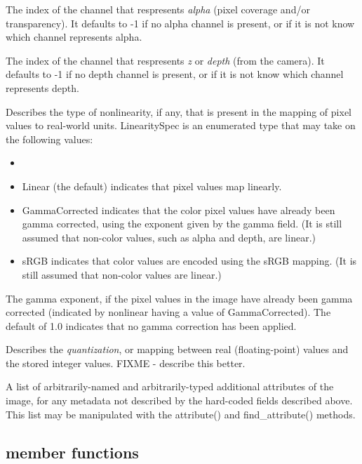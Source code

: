 The index of the channel that respresents \emph{alpha} (pixel coverage
and/or transparency).  It defaults to -1 if no alpha channel is present,
or if it is not know which channel represents alpha.
\apiend

The index of the channel that respresents \emph{z} or \emph{depth} (from
the camera).  It defaults to -1 if no depth channel is present, or if it
is not know which channel represents depth.
\apiend

Describes the type of nonlinearity, if any, that is present in the
mapping of pixel values to real-world units.  {\kw LinearitySpec} is
an enumerated type that may take on the following values:
\begin{itemize}
\item[] 
\item {\kw Linear} (the default) indicates that pixel values map
  linearly.
\item {\kw GammaCorrected} indicates that the color pixel values have
  already been gamma corrected, using the exponent given by the {\kw
    gamma} field.  (It is still assumed that non-color values, such as
  alpha and depth, are linear.)
\item {\kw sRGB} indicates that color values are encoded using the sRGB
  mapping.  (It is still assumed that non-color values are linear.)
\end{itemize}
\apiend

The gamma exponent, if the pixel values in the image have already been
gamma corrected (indicated by {\kw nonlinear} having a value of {\kw
GammaCorrected}).  The default of 1.0 indicates that no gamma
correction has been applied.
\apiend

Describes the \emph{quantization}, or mapping between real
(floating-point) values and the stored integer values.
FIXME - describe this better.
\apiend

A list of arbitrarily-named and arbitrarily-typed additional attributes
of the image, for any metadata not described by the hard-coded fields
described above.  This list may be manipulated with the {\kw
attribute()} and {\kw find_attribute()} methods.
\apiend

\subsection{\ImageSpec member functions}

